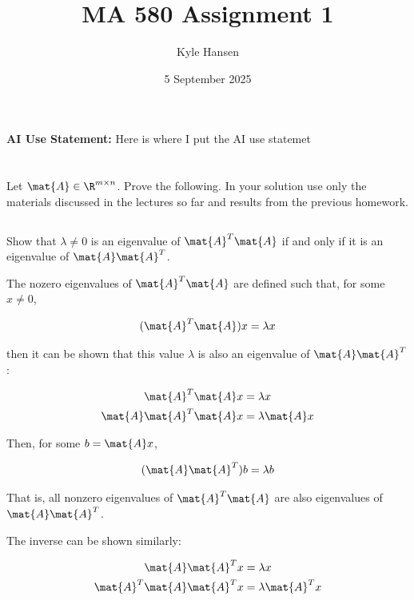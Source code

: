\documentclass{template}
\title{MA 580 Assignment 1}
\author{Kyle Hansen}
\date{5 September 2025}
\begin{document}
\maketitle

\textbf{AI Use Statement: }Here is where I put the AI use statemet

\section{}

Let $\mat{A} \in \R^{m \times n}$. 
Prove the following. 
In your solution 
use only the materials discussed in the lectures so far and results 
from the previous homework.

\subsection{}
Show that $\lambda \neq 0$ is an eigenvalue of $\mat{A}^T \mat{A}$ if and 
only if it is an eigenvalue of $\mat{A}\mat{A}^T$.

The nozero eigenvalues of $\mat{A}^T \mat{A}$ are defined such that, for some $x \neq 0$,

\begin{equation}
    (\mat{A}^T \mat{A})x = \lambda x
\end{equation}

then it can be shown that this value $\lambda$ is also an eigenvalue of $\mat{A}\mat{A}^T $:

\begin{equation}
    \begin{aligned}
    \mat{A}^T \mat{A}x &= \lambda x\\
    \mat{A}\mat{A}^T \mat{A}x &= \lambda \mat{A} x\\
    \end{aligned}
\end{equation}

Then, for some $b = \mat{A}x$, 

\begin{equation}
    (\mat{A}\mat{A}^T )b = \lambda b
\end{equation}

That is, all nonzero eigenvalues of $\mat{A}^T \mat{A}$ are also eigenvalues of $\mat{A}\mat{A}^T$.

The inverse can be shown similarly:

\begin{equation}
    \begin{aligned}
    \mat{A}\mat{A}^T x &= \lambda x\\
    \mat{A}^T \mat{A}\mat{A}^Tx &= \lambda \mat{A}^T x\\
    \end{aligned}
\end{equation}
\end{document}

